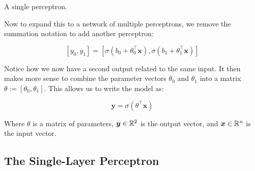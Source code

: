 \begin{marginfigure}
    \caption{A single perceptron.}
    \label{fig:perceptron}
\end{marginfigure}


\bigskip

Now to expand this to a network of multiple perceptrons, we remove the summation notation to add another perceptron:

\[
    [y_0, y_1] = \left[ \sigma(b_0 + \theta_0^\top \bm{x}), \sigma(b_1 + \theta_1^\top \bm{x}) \right]
\]

Notice how we now have a second output related to the same input. It then makes more sense to combine the parameter vectors $\theta_0$ and $\theta_1$ into a matrix $\theta := [\theta_0, \theta_1]$. This allows us to write the model as:

\[
    \bm{y} = \sigma(\theta^\top \bm{x})
\]

Where $\theta$ is a matrix of parameters, $\bm{y} \in \mathbb{R}^2$ is the output vector, and $\bm{x} \in \mathbb{R}^n$ is the input vector.


\subsection{The Single-Layer Perceptron}

